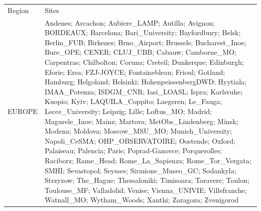 \documentclass[journal abbreviation, manuscript]{copernicus}
\begin{document}
\begin{table}
 \scriptsize
 \begin{tabularx}{\textwidth}{lX}
  \tophline
  Region    & Sites                                                                                                                                                                                                                                                                                                                                                                                                                                                                                                                                                                                                                                                                                                                                                                                                                                                                                                                                                                                                                                                                                                                                                                                                                                                                                                                                                                                                                                                         \\
  \middlehline
  EUROPE    & Andenes; Arcachon; Aubiere\_LAMP; Autilla; Avignon; BORDEAUX; Barcelona; Bari\_University; Bayfordbury; Belsk; Berlin\_FUB; Birkenes; Brno\_Airport; Brussels; Bucharest\_Inoe; Bure\_OPE; CENER; CLUJ\_UBB; Cabauw; Camborne\_MO; Carpentras; Chilbolton; Coruna; Creteil; Dunkerque; Edinburgh; Eforie; Ersa; FZJ-JOYCE; Fontainebleau; Frioul; Gotland; Hamburg; Helgoland; Helsinki; HohenpeissenbergDWD; Hyytiala; IMAA\_Potenza; ISDGM\_CNR; Iasi\_LOASL; Ispra; Karlsruhe; Kuopio; Kyiv; LAQUILA\_Coppito; Laegeren; Le\_Fauga; Lecce\_University; Leipzig; Lille; Loftus\_MO; Madrid; Magurele\_Inoe; Mainz; Martova; MetObs\_Lindenberg; Minsk; Modena; Moldova; Moscow\_MSU\_MO; Munich\_University; Napoli\_CeSMA; OHP\_OBSERVATOIRE; Oostende; Oxford; Palaiseau; Palencia; Paris; Poprad-Ganovce; Porquerolles; Raciborz; Rame\_Head; Rome\_La\_Sapienza; Rome\_Tor\_Vergata; SMHI; Sevastopol; Seysses; Sirmione\_Museo\_GC; Sodankyla; Strzyzow; The\_Hague; Thessaloniki; Timisoara; Toravere; Toulon; Toulouse\_MF; Valladolid; Venise; Vienna\_UNIVIE; Villefranche; Watnall\_MO; Wytham\_Woods; Xanthi; Zaragoza; Zvenigorod                                                                                                                                                                                                                                                                                                               \\

\end{tabularx}
\end{table}
\end{document}
